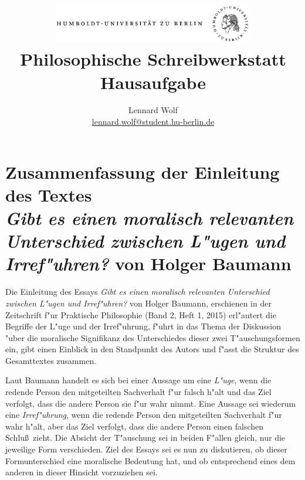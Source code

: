 \documentclass[a4paper]{article}
\begin{document}
\title{
	\includegraphics*[width=0.65\textwidth]{images/hu_logo.png}\\
	\vspace{24pt}
	Philosophische Schreibwerkstatt\\Hausaufgabe}
\author{Lennard Wolf\\
        \href{mailto:lennard.wolf@student.hu-berlin.de}{lennard.wolf@student.hu-berlin.de}}
\maketitle


\section*{Zusammenfassung der Einleitung des Textes \\ \emph{Gibt es einen moralisch relevanten Unterschied zwischen L"ugen und Irref"uhren?} von Holger Baumann}

Die Einleitung des Essays \emph{Gibt es einen moralisch relevanten Unterschied zwischen L"ugen und Irref"uhren?} von Holger Baumann, erschienen in der Zeitschrift f"ur Praktische Philosophie (Band 2, Heft 1, 2015) erl"autert die Begriffe der L"uge und der Irref"uhrung, f"uhrt in das Thema der Diskussion "uber die moralische Signifikanz des Unterschiedes dieser zwei T"auschungsformen ein, gibt einen Einblick in den Standpunkt des Autors und f"asst die Struktur des Gesamttextes zusammen. 

Laut Baumann handelt es sich bei einer Aussage um eine \emph{L"uge}, wenn die redende Person den mitgeteilten Sachverhalt f"ur falsch h"alt und das Ziel verfolgt, dass die andere Person sie f"ur wahr nimmt. Eine Aussage sei wiederum eine \emph{Irref"uhrung}, wenn die redende Person den mitgeteilten Sachverhalt f"ur wahr h"alt, aber das Ziel verfolgt, dass die andere Person einen falschen Schlu\ss~zieht. Die Absicht der T"auschung sei in beiden F"allen gleich, nur die jeweilige Form verschieden. Ziel des Essays sei es nun zu diskutieren, ob dieser Formunterschied eine moralische Bedeutung hat, und ob entsprechend eines dem anderen in dieser Hinsicht vorzuziehen sei. 
\end{document}
